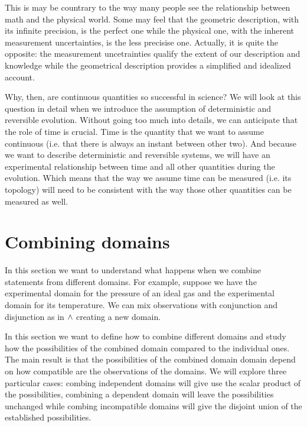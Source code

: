 \documentclass[11pt,letterpaper,fleqn]{memoir} %
\begin{document}
This is may be countrary to the way many people see the relationship between math and the physical world. Some may feel that the geometric description, with its infinite precision, is the perfect one while the physical one, with the inherent measurement uncertainties, is the less precisise one. Actually, it is quite the opposite: the measurement uncetrainties qualify the extent of our description and knowledge while the geometrical description provides a simplified and idealized account.

Why, then, are continuous quantities so successful in science? We will look at this question in detail when we introduce the assumption of deterministic and reversible evolution. Without going too much into details, we can anticipate that the role of time is crucial. Time is the quantity that we want to assume continuous (i.e. that there is always an instant between other two). And because we want to describe deterministic and reversible systems, we will have an experimental relationship between time and all other quantities during the evolution. Which means that the way we assume time can be measured (i.e. its topology) will need to be consistent with the way those other quantities can be measured as well.


\section{Combining domains}

In this section we want to understand what happens when we combine statements from different domains. For example, suppose we have the experimental domain for the pressure of an ideal gas and the experimental domain for its temperature. We can mix observations with conjunction and disjunction as in $\wedge$ creating a new domain.

In this section we want to define how to combine different domains and study how the possibilities of the combined domain compared to the individual ones. The main result is that the possibilities of the combined domain domain depend on how compatible are the observations of the domains. We will explore three particular cases: combing independent domains will give use the scalar product of the possibilities, combining a dependent domain will leave the possibilities unchanged while combing incompatible domains will give the disjoint union of the established possibilities.
\end{document}

